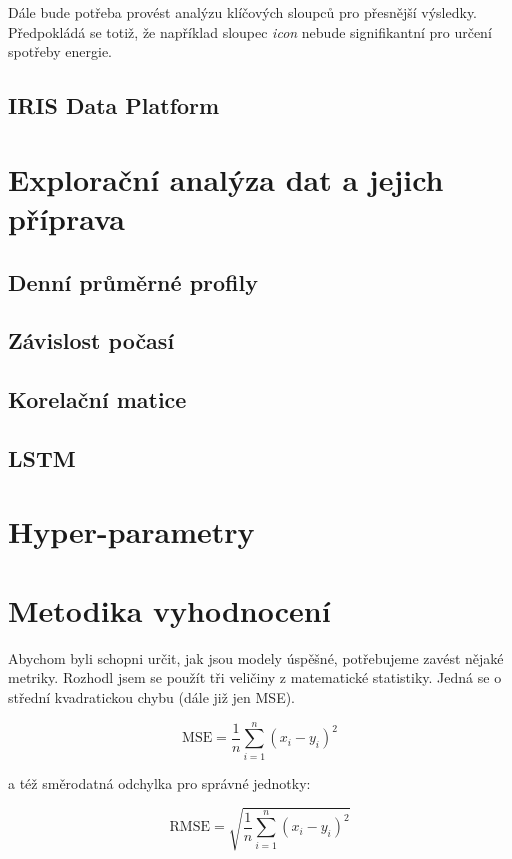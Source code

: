 \documentclass[FM,BP,fonts]{tulthesis}
\begin{document}
Dále bude potřeba provést analýzu klíčových sloupců pro přesnější výsledky. Předpokládá se totiž, že například sloupec \textit{icon} nebude signifikantní pro určení spotřeby energie.
\newpage
\subsection{IRIS Data Platform}

\newpage
\section{Explorační analýza dat a jejich příprava}
\subsection{Denní průměrné profily}
\subsection{Závislost počasí}
\subsection{Korelační matice}
\subsection{LSTM}
\section{Hyper-parametry}


\newpage

\section{Metodika vyhodnocení}\label{section:error-matrix}
Abychom byli schopni určit, jak jsou modely úspěšné, potřebujeme zavést nějaké metriky. Rozhodl jsem se použít tři veličiny z matematické statistiky. Jedná se o střední kvadratickou chybu (dále již jen MSE). 

\begin{equation}
	\text{MSE} = \frac{1}{n}\sum_{i=1}^{n}(x_i-y_i)^2 
\end{equation}

a též směrodatná odchylka pro správné jednotky:

\begin{equation}
	\text{RMSE} = \sqrt{\frac{1}{n}\sum_{i=1}^{n}(x_i-y_i)^2}
\end{equation}
\end{document}
